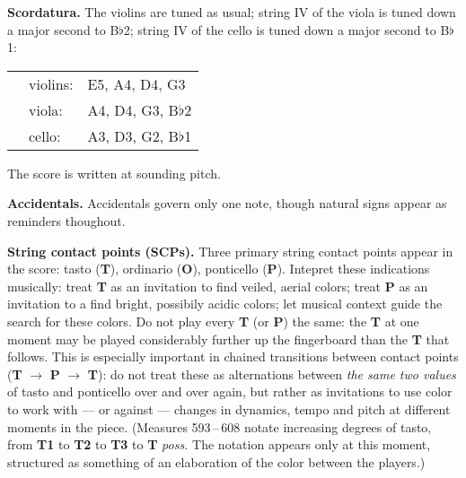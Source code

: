 \textbf{Scordatura.} The violins are tuned as usual; string IV of the viola is tuned down
a major second to B$\flat$2; string IV of the cello is tuned down a major second to
B$\flat$1:

\begin{tabu}{l l l}
\phantom{M} & violins: & E5, A4, D4, G3 \\
            & viola: & A4, D4, G3, B$\flat$2 \\
            & cello: & A3, D3, G2, B$\flat$1 \\
\end{tabu}

The score is written at sounding pitch.

\textbf{Accidentals.} Accidentals govern only one note, though natural signs appear as
reminders thoughout.

\textbf{String contact points (SCPs).} Three primary string contact points appear in the
score: tasto (\textbf{T}), ordinario (\textbf{O}), ponticello (\textbf{P}). Intepret
these indications musically: treat \textbf{T} as an invitation to find veiled, aerial
colors; treat \textbf{P} as an invitation to a find bright, possibily acidic colors; let
musical context guide the search for these colors. Do not play every \textbf{T} (or
\textbf{P}) the same: the \textbf{T} at one moment may be played considerably further up
the fingerboard than the \textbf{T} that follows. This is especially important in chained
transitions between contact points (\textbf{T} $\longrightarrow$ \textbf{P}
$\longrightarrow$ \textbf{T}): do not treat these as alternations between \textit{the
same two values} of tasto and ponticello over and over again, but rather as invitations
to use color to work with --- or against --- changes in dynamics, tempo and pitch at
different moments in the piece. (Measures 593\,--\,608 notate increasing degrees of
tasto, from \textbf{T1} to \textbf{T2} to \textbf{T3} to \textbf{T} \textit{poss.} The
notation appears only at this moment, structured as something of an elaboration of the
color between the players.)

